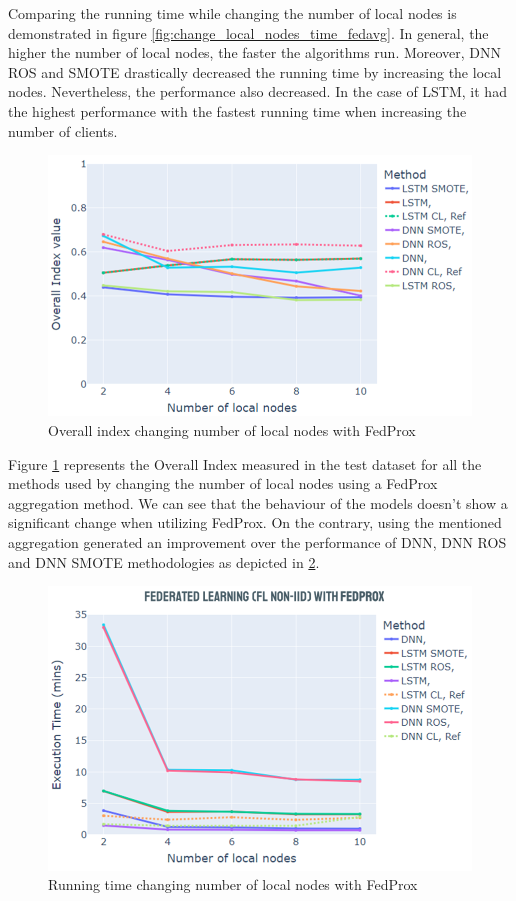 Comparing the running time while changing the number of local nodes is demonstrated in figure \ref{fig:change_local_nodes_time_fedavg}. In general, the higher the number of local nodes, the faster the algorithms run. Moreover, DNN ROS and SMOTE drastically decreased the running time by increasing the local nodes. Nevertheless, the performance also decreased. In the case of LSTM, it had the highest performance with the fastest running time when increasing the number of clients.

\begin{figure}[H]
\centering
\includegraphics[scale=0.6]{img/change_local_nodes_metrics_fedavg.png}
\caption{Overall index changing number of local nodes with FedProx}
\label{fig:change_local_nodes_metrics_fedprox}
\end{figure}

Figure \ref{fig:change_local_nodes_metrics_fedprox} represents the Overall Index measured in the test dataset for all the methods used by changing the number of local nodes using a FedProx aggregation method. We can see that the behaviour of the models doesn't show a significant change when utilizing FedProx. On the contrary, using the mentioned aggregation generated an improvement over the performance of  DNN, DNN ROS and DNN SMOTE methodologies as depicted in \ref{fig:change_local_nodes_time_fedprox}.

\begin{figure}[H]
\centering
\includegraphics[scale=0.6]{img/change_local_nodes_time_fedprox.png}
\caption{Running time changing number of local nodes with FedProx}
\label{fig:change_local_nodes_time_fedprox}
\end{figure}